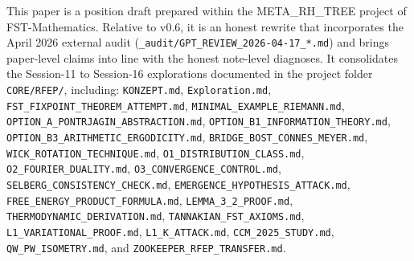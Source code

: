 \documentclass[11pt,a4paper]{article}
\theoremstyle{plain}
\theoremstyle{definition}
\begin{document}
This paper is a position draft prepared within the META\_RH\_TREE
project of FST-Mathematics.  Relative to v0.6, it is an honest
rewrite that incorporates the April 2026 external audit
(\texttt{\_audit/GPT\_REVIEW\_2026-04-17\_*.md}) and brings
paper-level claims into line with the honest note-level diagnoses.
It consolidates the Session-11 to Session-16 explorations documented
in the project folder
\texttt{CORE/RFEP/}, including:
\texttt{KONZEPT.md},
\texttt{Exploration.md},
\texttt{FST\_FIXPOINT\_THEOREM\_ATTEMPT.md},
\texttt{MINIMAL\_EXAMPLE\_RIEMANN.md},
\texttt{OPTION\_A\_PONTRJAGIN\_ABSTRACTION.md},
\texttt{OPTION\_B1\_INFORMATION\_THEORY.md},
\texttt{OPTION\_B3\_ARITHMETIC\_ERGODICITY.md},
\texttt{BRIDGE\_BOST\_CONNES\_MEYER.md},
\texttt{WICK\_ROTATION\_TECHNIQUE.md},
\texttt{O1\_DISTRIBUTION\_CLASS.md},
\texttt{O2\_FOURIER\_DUALITY.md},
\texttt{O3\_CONVERGENCE\_CONTROL.md},
\texttt{SELBERG\_CONSISTENCY\_CHECK.md},
\texttt{EMERGENCE\_HYPOTHESIS\_ATTACK.md},
\texttt{FREE\_ENERGY\_PRODUCT\_FORMULA.md},
\texttt{LEMMA\_3\_2\_PROOF.md},
\texttt{THERMODYNAMIC\_DERIVATION.md},
\texttt{TANNAKIAN\_FST\_AXIOMS.md},
\texttt{L1\_VARIATIONAL\_PROOF.md},
\texttt{L1\_K\_ATTACK.md},
\texttt{CCM\_2025\_STUDY.md},
\texttt{QW\_PW\_ISOMETRY.md}, and
\texttt{ZOOKEEPER\_RFEP\_TRANSFER.md}.
\end{document}
